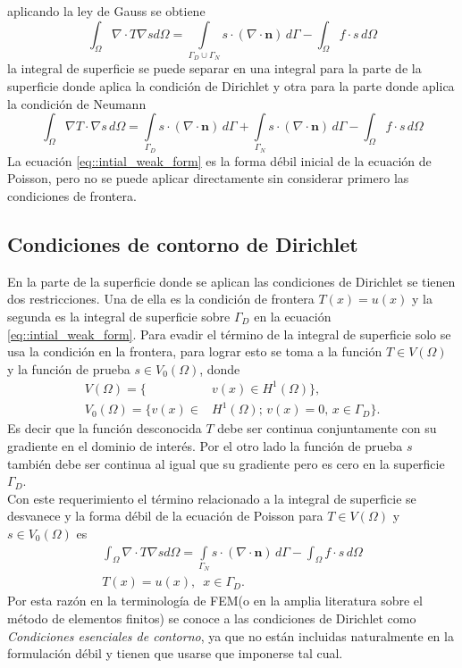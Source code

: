 \documentclass[a4paper]{article}
\begin{document}
aplicando la ley de Gauss se obtiene
\begin{equation}
\int_{\Omega}\nabla \cdot T \nabla s d\Omega = \int\limits_{\Gamma_D \cup \Gamma_N} s \cdot(\nabla\cdot \mathbf{n})\, d\Gamma-\int_{\Omega}f\cdot s\, d\Omega
\end{equation}
la integral de superficie se puede separar en una integral para la parte de la superficie donde aplica la condición de Dirichlet y otra para la parte donde aplica la condición de Neumann
\begin{equation}\label{eq::intial_weak_form}
\int_{\Omega}\nabla  T \cdot \nabla s\, d\Omega = \int\limits_{\Gamma_D} s \cdot(\nabla\cdot \mathbf{n})\, d\Gamma+\int\limits_{\Gamma_N} s \cdot(\nabla\cdot \mathbf{n})\, d\Gamma-\int_{\Omega}f\cdot s\, d\Omega
\end{equation}
La ecuación \ref{eq::intial_weak_form} es la forma débil inicial de la ecuación de Poisson, pero no se puede aplicar directamente sin considerar primero las condiciones de frontera.

\subsection{Condiciones de contorno de Dirichlet}
En la parte de la superficie donde se aplican las condiciones de Dirichlet se tienen dos restricciones. Una de ella es la condición de frontera $T(x)=u(x)$ y la segunda es la integral de superficie sobre $\Gamma_D$ en la ecuación \ref{eq::intial_weak_form}. Para evadir el término de la integral de superficie solo se usa la condición en la frontera,  para lograr esto se toma a la función $T \in V(\Omega)$ y la función de prueba $s\in V_0(\Omega)$, donde
\begin{equation*}
\begin{aligned}
V(\Omega)=\{ &v(x)\in H^1(\Omega)\},\\
V_0(\Omega)=\{v(x) \in& H^1(\Omega);\, v(x)=0,\, x\in\Gamma_D\}.
\end{aligned}
\end{equation*}
Es decir que la función desconocida $T$ debe ser continua conjuntamente con su gradiente en el dominio de interés. Por el otro lado la función de prueba $s$ también debe ser continua al igual que su gradiente pero es cero en la superficie $\Gamma_D$.\\
Con este requerimiento el término relacionado a la integral de superficie se desvanece y la forma débil de la ecuación de Poisson para $T\in V(\Omega)$ y $s\in V_0(\Omega)$ es
\begin{equation}
\begin{aligned}
\int_{\Omega}\nabla \cdot T \nabla s d\Omega = \int\limits_{\Gamma_N} s \cdot(\nabla\cdot \mathbf{n})\, d\Gamma-\int_{\Omega}f\cdot s\, d\Omega\\
T(x)=u(x),\,\,\, x\in \Gamma_D.
\end{aligned}
\end{equation}
Por esta razón en la terminología de FEM(o en la amplia literatura sobre el método de elementos finitos) se conoce a las condiciones de Dirichlet como \textit{Condiciones esenciales de contorno}, ya que no están incluidas naturalmente en la formulación débil y tienen que usarse que imponerse tal cual.
\end{document}
